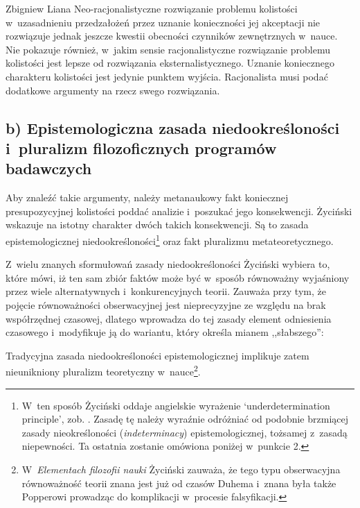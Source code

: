 \begin{artplenv}{Zbigniew Liana}
Neo-racjonalistyczne rozwiązanie problemu kolistości w~uzasadnieniu przedzałożeń przez uznanie konieczności jej akceptacji nie rozwiązuje jednak jeszcze kwestii obecności czynników zewnętrznych w~nauce. Nie pokazuje również, w~jakim sensie racjonalistyczne rozwiązanie problemu kolistości jest lepsze od rozwiązania eksternalistycznego. Uznanie koniecznego charakteru kolistości jest jedynie punktem wyjścia. Racjonalista musi podać dodatkowe argumenty na rzecz swego rozwiązania.

\subsection{b) Epistemologiczna zasada niedookreśloności i~pluralizm filozoficznych programów badawczych}

Aby znaleźć takie argumenty, należy metanaukowy fakt koniecznej presupozycyjnej kolistości poddać analizie i~poszukać jego konsekwencji. Życiński wskazuje na istotny charakter dwóch takich konsekwencji. Są to zasada epistemologicznej niedookreśloności\footnote{W~ten sposób Życiński oddaje angielskie wyrażenie ‘underdetermination principle', zob.
\parencite[][s.~129n]{zycinski_teizm_1985}. %
 Zasadę tę należy wyraźnie odróżniać od podobnie brzmiącej zasady nieokreśloności (\textit{indeterminacy}) epistemologicznej, tożsamej z~zasadą niepewności. Ta ostatnia zostanie omówiona poniżej w~punkcie 2.} oraz fakt pluralizmu metateoretycznego.

Z~wielu znanych sformułowań zasady niedookreśloności Życiński wybiera to, które mówi, iż ten sam zbiór faktów może być w~sposób równoważny wyjaśniony przez wiele alternatywnych i~konkurencyjnych teorii. Zauważa przy tym, że pojęcie równoważności obserwacyjnej jest nieprecyzyjne ze względu na brak współrzędnej czasowej, dlatego wprowadza do tej zasady element odniesienia czasowego i~modyfikuje ją do wariantu, który określa mianem ,,słabszego'':

Tradycyjna zasada niedookreśloności epistemologicznej implikuje zatem nieunikniony pluralizm teoretyczny w~nauce\footnote{W~\textit{Elementach filozofii nauki}
\parencites[][s.~106n]{zycinski_elementy_1996}[][s.~143]{zycinski_elementy_2015} %
 Życiński zauważa, że tego typu obserwacyjna równoważność teorii znana jest już od czasów Duhema i~znana była także Popperowi prowadząc do komplikacji w~procesie falsyfikacji.}.


\end{artplenv}
